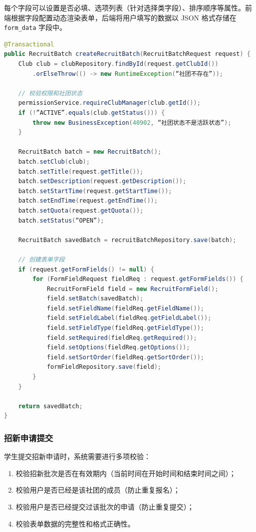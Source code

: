 每个字段可以设置是否必填、选项列表（针对选择类字段）、排序顺序等属性。前端根据字段配置动态渲染表单，后端将用户填写的数据以 JSON 格式存储在 \texttt{form\_data} 字段中。

\begin{lstlisting}[language=Java, caption=创建招新批次与表单字段（节选）]
@Transactional
public RecruitBatch createRecruitBatch(RecruitBatchRequest request) {
    Club club = clubRepository.findById(request.getClubId())
        .orElseThrow(() -> new RuntimeException(“社团不存在”));

    // 校验权限和社团状态
    permissionService.requireClubManager(club.getId());
    if (!”ACTIVE”.equals(club.getStatus())) {
        throw new BusinessException(40902, “社团状态不是活跃状态”);
    }

    RecruitBatch batch = new RecruitBatch();
    batch.setClub(club);
    batch.setTitle(request.getTitle());
    batch.setDescription(request.getDescription());
    batch.setStartTime(request.getStartTime());
    batch.setEndTime(request.getEndTime());
    batch.setQuota(request.getQuota());
    batch.setStatus(“OPEN”);

    RecruitBatch savedBatch = recruitBatchRepository.save(batch);

    // 创建表单字段
    if (request.getFormFields() != null) {
        for (FormFieldRequest fieldReq : request.getFormFields()) {
            RecruitFormField field = new RecruitFormField();
            field.setBatch(savedBatch);
            field.setFieldName(fieldReq.getFieldName());
            field.setFieldLabel(fieldReq.getFieldLabel());
            field.setFieldType(fieldReq.getFieldType());
            field.setRequired(fieldReq.getRequired());
            field.setOptions(fieldReq.getOptions());
            field.setSortOrder(fieldReq.getSortOrder());
            formFieldRepository.save(field);
        }
    }

    return savedBatch;
}
\end{lstlisting}

\subsubsection{招新申请提交}

学生提交招新申请时，系统需要进行多项校验：

\begin{enumerate}
  \item 校验招新批次是否在有效期内（当前时间在开始时间和结束时间之间）；
  \item 校验用户是否已经是该社团的成员（防止重复报名）；
  \item 校验用户是否已经提交过该批次的申请（防止重复提交）；
  \item 校验表单数据的完整性和格式正确性。
\end{enumerate}

